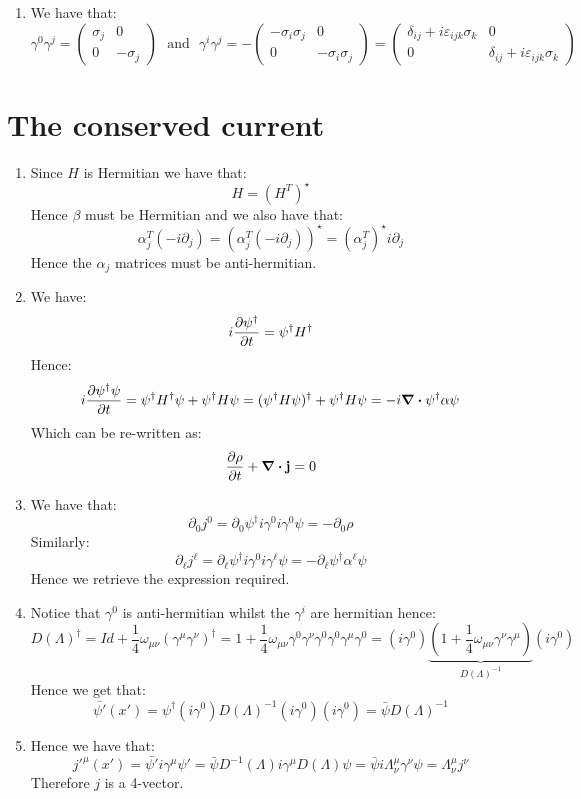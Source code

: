 \documentclass[10pt,a4paper]{book}
\begin{document}
\begin{enumerate}
\item We have that:
\[
\gamma^0 \gamma^j =  \begin{pmatrix}
\sigma_j & 0\\
0 & -\sigma_j
\end{pmatrix} \mbox{~~and~~} 
\gamma^i \gamma^j = - \begin{pmatrix}
-\sigma_i \sigma_j & 0 \\
0 & -\sigma_i \sigma_j
\end{pmatrix} = \begin{pmatrix}
\delta_{ij} + i \varepsilon_{ijk} \sigma_k & 0\\
0 & \delta_{ij} + i \varepsilon_{ijk} \sigma_k
\end{pmatrix}
\]

\end{enumerate}

\section{The conserved current}

\begin{enumerate}

\item Since $H$ is Hermitian we have that:
\[
H = (H^T)^\star
\]
Hence $\beta$ must be Hermitian and we also have that:
\[
\alpha_j^T (-i \partial_j) = (\alpha_j^T (- i \partial_j))^\star = (\alpha_j^T)^\star i \partial_j 
\]
Hence the $\alpha_j$ matrices must be anti-hermitian.

\item We have:
\[
i \pdv{\psi^\dagger}{t} = \psi^\dagger H^\dagger
\]
Hence:
\[
i\pdv{\psi^\dagger \psi}{t} = \psi^\dagger H^\dagger \psi + \psi^\dagger H \psi = (\psi^\dagger H \psi)^\dagger + \psi^\dagger H \psi = - i \div \psi^\dagger \vb{\alpha} \psi
\]
Which can be re-written as:
\[
\pdv{\rho}{t} + \div \vb{j} = 0
\]

\item We have that:
\[
\partial_0 j^0 = \partial_0 \psi^\dagger i \gamma^0 i \gamma^0 \psi = - \partial_0 \rho
\]
Similarly:
\[
\partial_\ell j^\ell = \partial_\ell \psi^\dagger i \gamma^0 i \gamma^\ell \psi = - \partial_\ell \psi^\dagger \alpha^\ell \psi 
\]
Hence we retrieve the expression required.

\item Notice that $\gamma^0$ is anti-hermitian whilst the $\gamma^i$ are hermitian hence:
\[
D(\Lambda)^\dagger = Id + \frac{1}{4} \omega_{\mu \nu} (\gamma^\mu \gamma^\nu)^\dagger = 1 + \frac{1}{4} \omega_{\mu \nu} \gamma^0 \gamma^\nu \gamma^0 \gamma^0 \gamma^\mu \gamma^0 = (i \gamma^0) \underbrace{(1 + \frac{1}{4} \omega_{\mu \nu}\gamma^\nu \gamma^\mu)}_{D(\Lambda)^{-1}} (i\gamma^0)
\]
Hence we get that:
\[
\bar{\psi'}(x') = \psi^\dagger (i \gamma^0) D(\Lambda)^{-1} (i\gamma^0) (i\gamma^0) = \bar{\psi} D(\Lambda)^{-1}
\]

\item Hence we have that:
\[
j'^\mu(x') = \bar{\psi'} i \gamma^\mu \psi' = \bar{\psi} D^{-1}(\Lambda) i \gamma^\mu  D(\Lambda) \psi = \bar{\psi} i \Lambda^\mu_\nu \gamma^\nu \psi = \Lambda^\mu_\nu j^\nu
\]
Therefore $j$ is a 4-vector.

\end{enumerate}
\end{document}
